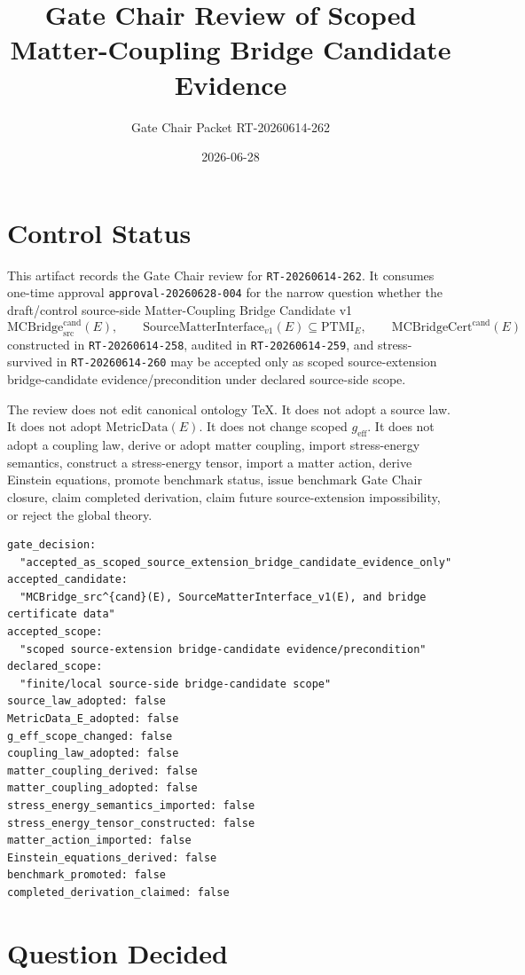 \documentclass[11pt]{article}
\title{Gate Chair Review of Scoped Matter-Coupling Bridge Candidate Evidence}
\author{Gate Chair Packet RT-20260614-262}
\date{2026-06-28}
\newcommand{\MetricData}{\mathrm{MetricData}}
\newcommand{\geff}{g_{\mathrm{eff}}}
\newcommand{\MCBridgeCand}{\mathrm{MCBridge}_{\mathrm{src}}^{\mathrm{cand}}}
\newcommand{\MCBridgeCertCand}{\mathrm{MCBridgeCert}^{\mathrm{cand}}}
\newcommand{\SMI}{\mathrm{SourceMatterInterface}_{v1}}
\newcommand{\PTMI}{\mathrm{PTMI}}
\begin{document}
\maketitle

\section{Control Status}

This artifact records the Gate Chair review for \texttt{RT-20260614-262}. It
consumes one-time approval \texttt{approval-20260628-004} for the narrow
question whether the draft/control source-side Matter-Coupling Bridge
Candidate v1
\[
  \MCBridgeCand(E),
  \qquad
  \SMI(E)\subseteq\PTMI_E,
  \qquad
  \MCBridgeCertCand(E)
\]
constructed in \texttt{RT-20260614-258}, audited in
\texttt{RT-20260614-259}, and stress-survived in
\texttt{RT-20260614-260} may be accepted only as scoped source-extension
bridge-candidate evidence/precondition under declared source-side scope.

The review does not edit canonical ontology TeX. It does not adopt a source
law. It does not adopt \(\MetricData(E)\). It does not change scoped
\(\geff\). It does not adopt a coupling law, derive or adopt matter coupling,
import stress-energy semantics, construct a stress-energy tensor, import a
matter action, derive Einstein equations, promote benchmark status, issue
benchmark Gate Chair closure, claim completed derivation, claim future
source-extension impossibility, or reject the global theory.

\begin{verbatim}
gate_decision:
  "accepted_as_scoped_source_extension_bridge_candidate_evidence_only"
accepted_candidate:
  "MCBridge_src^{cand}(E), SourceMatterInterface_v1(E), and bridge certificate data"
accepted_scope:
  "scoped source-extension bridge-candidate evidence/precondition"
declared_scope:
  "finite/local source-side bridge-candidate scope"
source_law_adopted: false
MetricData_E_adopted: false
g_eff_scope_changed: false
coupling_law_adopted: false
matter_coupling_derived: false
matter_coupling_adopted: false
stress_energy_semantics_imported: false
stress_energy_tensor_constructed: false
matter_action_imported: false
Einstein_equations_derived: false
benchmark_promoted: false
completed_derivation_claimed: false
\end{verbatim}

\section{Question Decided}
\end{document}
